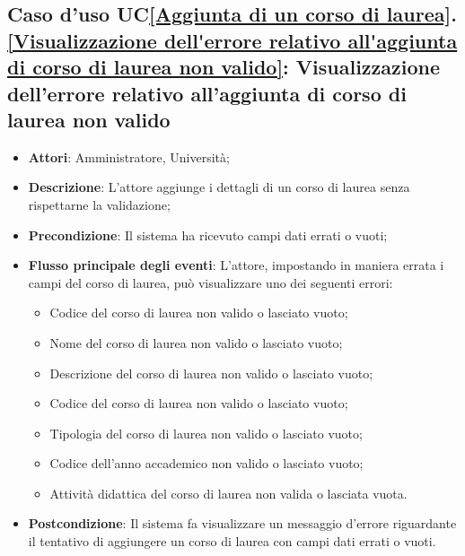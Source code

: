 \subsection{Caso d'uso UC\ref{Aggiunta di un corso di laurea}.\ref{Visualizzazione dell'errore relativo all'aggiunta di corso di laurea non valido}: Visualizzazione dell'errore relativo all'aggiunta di corso di laurea non valido }
\begin{itemize}
	\item \textbf{Attori}: Amministratore, Università;
	\item \textbf{Descrizione}: L'attore aggiunge i dettagli di un corso di laurea senza rispettarne la validazione;
	
	\item \textbf{Precondizione}: Il sistema ha ricevuto campi dati errati o vuoti;
	
	\item \textbf{Flusso principale degli eventi}: L'attore, impostando in maniera errata i campi del corso di laurea, può visualizzare uno dei seguenti errori: 
	\begin{itemize}
		\item Codice del corso di laurea non valido o lasciato vuoto;
		\item Nome del corso di laurea non valido o lasciato vuoto;
		\item Descrizione del corso di laurea non valido o lasciato vuoto;
		\item Codice del corso di laurea non valido o lasciato vuoto;
		\item Tipologia del corso di laurea non valido o lasciato vuoto;
		\item Codice dell'anno accademico non valido o lasciato vuoto;
		\item Attività didattica del corso di laurea non valida o lasciata vuota.
	\end{itemize}
	
	\item \textbf{Postcondizione}: Il sistema fa visualizzare un messaggio d'errore riguardante il tentativo di aggiungere un corso di laurea con campi dati errati o vuoti.
	
\end{itemize}





